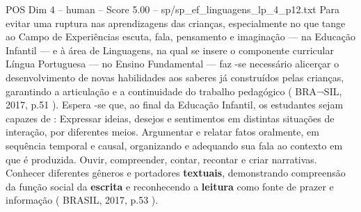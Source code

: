 \begin{textsample}{POS Dim 4 – human – Score 5.00 – sp/sp\_ef\_linguagens\_lp\_4\_p12.txt}  \label{ex:f4_pos_012}
Para evitar uma ruptura nas aprendizagens das crianças, especialmente no que tange ao Campo de Experiências escuta, fala, pensamento e imaginação — na Educação Infantil — e à área de Linguagens, na qual se insere o componente curricular Língua Portuguesa — no Ensino Fundamental — faz -se necessário alicerçar o desenvolvimento de novas habilidades aos saberes já construídos pelas crianças, garantindo a articulação e a continuidade do trabalho pedagógico ( BRA¬SIL, 2017, p.51 ).
Espera -se que, ao final da Educação Infantil, os estudantes sejam capazes de : Expressar ideias, desejos e sentimentos em distintas situações de interação, por diferentes meios.
Argumentar e relatar fatos oralmente, em sequência temporal e causal, organizando e adequando sua fala ao contexto em que é produzida.
Ouvir, compreender, contar, recontar e criar narrativas.
Conhecer diferentes gêneros e portadores \textbf{textuais}, demonstrando compreensão da função social da \textbf{escrita} e reconhecendo a \textbf{leitura} como fonte de prazer e informação ( BRASIL, 2017, p.53 ).

\end{textsample}
